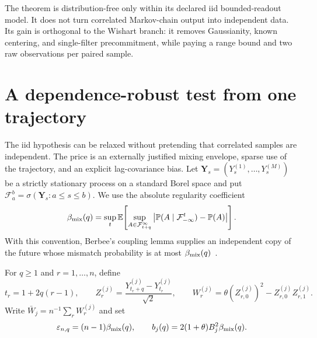 \documentclass[11pt]{article}
\theoremstyle{definition}
\theoremstyle{remark}
\begin{document}
The theorem is distribution-free only within its declared iid bounded-readout
model.  It does not turn correlated Markov-chain output into independent data.
Its gain is orthogonal to the Wishart branch: it removes Gaussianity, known
centering, and single-filter precommitment, while paying a range bound and two
raw observations per paired sample.

\section{A dependence-robust test from one trajectory}
\label{sec:mixing}

The iid hypothesis can be relaxed without pretending that correlated samples
are independent.  The price is an externally justified mixing envelope, sparse
use of the trajectory, and an explicit lag-covariance bias.  Let
$\mathbf Y_s=(Y_s^{(1)},\ldots,Y_s^{(M)})$ be a strictly stationary process on
a standard Borel space and put
\(\mathcal F_a^b=\sigma(\mathbf Y_s:a\leq s\leq b)\).  We use the absolute
regularity coefficient
\begin{equation}
 \beta_{\rm mix}(q)=\sup_t\mathbb E\!\left[
 \sup_{A\in\mathcal F_{t+q}^{\infty}}
 \left|\mathbb P(A\mid\mathcal F_{-\infty}^{t})-\mathbb P(A)\right|
 \right].                                                \label{eq:betamix}
\end{equation}
With this convention, Berbee's coupling lemma supplies an independent copy of
the future whose mismatch probability is at most
$\beta_{\rm mix}(q)$~\cite{Berbee1979}.

For $q\geq1$ and $r=1,\ldots,n$, define
\begin{equation}
 t_r=1+2q(r-1),\qquad
 Z_r^{(j)}=\frac{Y_{t_r+q}^{(j)}-Y_{t_r}^{(j)}}{\sqrt2},
 \qquad
 W_r^{(j)}=\theta(Z_{r,0}^{(j)})^2-Z_{r,0}^{(j)}Z_{r,1}^{(j)}. \label{eq:mixpairs}
\end{equation}
Write $\bar W_j=n^{-1}\sum_rW_r^{(j)}$ and set
\begin{equation}
 \varepsilon_{n,q}=(n-1)\beta_{\rm mix}(q),\qquad
 b_j(q)=2(1+\theta)B_j^2\beta_{\rm mix}(q).             \label{eq:mixpenalties}
\end{equation}
\end{document}
